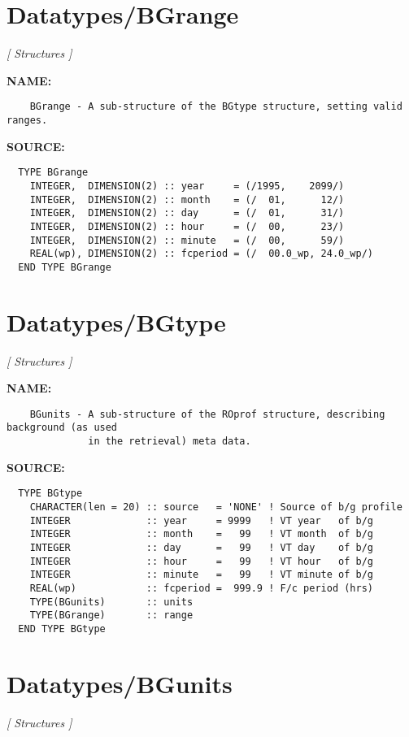 \section{Datatypes/BGrange}
\textsl{[ Structures ]}

\label{ch:robo19}
\label{ch:Datatypes_BGrange}
\textbf{NAME:}\hspace{0.08in}\begin{Verbatim}
    BGrange - A sub-structure of the BGtype structure, setting valid ranges.
\end{Verbatim}
\textbf{SOURCE:}\hspace{0.08in}\begin{Verbatim}
  TYPE BGrange
    INTEGER,  DIMENSION(2) :: year     = (/1995,    2099/)
    INTEGER,  DIMENSION(2) :: month    = (/  01,      12/)
    INTEGER,  DIMENSION(2) :: day      = (/  01,      31/)
    INTEGER,  DIMENSION(2) :: hour     = (/  00,      23/)
    INTEGER,  DIMENSION(2) :: minute   = (/  00,      59/)
    REAL(wp), DIMENSION(2) :: fcperiod = (/  00.0_wp, 24.0_wp/)
  END TYPE BGrange
\end{Verbatim}
\section{Datatypes/BGtype}
\textsl{[ Structures ]}

\label{ch:robo20}
\label{ch:Datatypes_BGtype}
\textbf{NAME:}\hspace{0.08in}\begin{Verbatim}
    BGunits - A sub-structure of the ROprof structure, describing background (as used
              in the retrieval) meta data.
\end{Verbatim}
\textbf{SOURCE:}\hspace{0.08in}\begin{Verbatim}
  TYPE BGtype
    CHARACTER(len = 20) :: source   = 'NONE' ! Source of b/g profile
    INTEGER             :: year     = 9999   ! VT year   of b/g
    INTEGER             :: month    =   99   ! VT month  of b/g
    INTEGER             :: day      =   99   ! VT day    of b/g
    INTEGER             :: hour     =   99   ! VT hour   of b/g
    INTEGER             :: minute   =   99   ! VT minute of b/g
    REAL(wp)            :: fcperiod =  999.9 ! F/c period (hrs)
    TYPE(BGunits)       :: units
    TYPE(BGrange)       :: range
  END TYPE BGtype
\end{Verbatim}
\section{Datatypes/BGunits}
\textsl{[ Structures ]}

